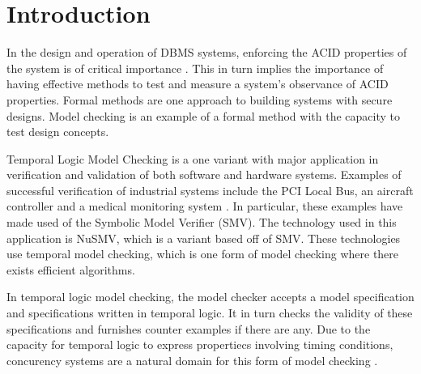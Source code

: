 \section{Introduction}
\label{introduction}
In the design and operation of DBMS systems, enforcing the ACID properties of the system is of critical importance \cite{textbook}. This in turn implies the importance of having effective methods to test and measure a system's observance of ACID properties. Formal methods are one approach to building systems with secure designs. Model checking is an example of a formal method with the capacity to test design concepts. 

Temporal Logic Model Checking is a one variant with major application in verification and validation of both software and hardware systems. Examples of successful verification of industrial systems include the PCI Local Bus, an aircraft controller and a medical monitoring system \cite{McMillian1993}. In particular, these examples have made used of the Symbolic Model Verifier (SMV). The technology used in this application is NuSMV, which is a variant based off of SMV. These technologies use temporal model checking, which is one form of model checking where there exists efficient algorithms.

In temporal logic model checking, the model checker accepts a model specification and specifications written in temporal logic. It in turn checks the validity of these specifications and furnishes counter examples if there are any. Due to the capacity for temporal logic to express propertiecs involving timing conditions, concurency systems are a natural domain for this form of model checking \cite{temporal}.



